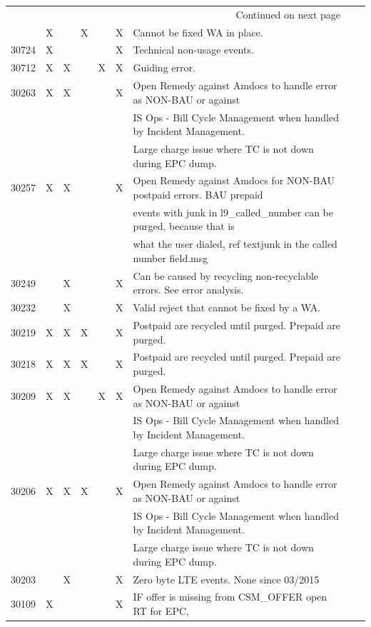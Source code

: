 \documentclass[12pt,twoside]{article}
\begin{document}
\begin{landscape}
\begin{longtable}{l|l|l|l|l|l|l|l|l}
\hline
\endhead
\hline\multicolumn{7}{r}{Continued on next page} \\
\endfoot
\endlastfoot
\hline
30728 & X &  & X &  & X & Cannot be fixed WA in place.\\
30724 & X &  &  &  & X & Technical non-usage events.\\
30712 & X & X &  & X & X & Guiding error.\\
30263 & X & X &  &  & X & Open Remedy against Amdocs to handle error as NON-BAU or against\\
 &  &  &  &  &  & IS Ops - Bill Cycle Management when handled by Incident Management.\\
 &  &  &  &  &  & Large charge issue where TC is not down during EPC dump.\\
30257 & X & X &  &  & X & Open Remedy against Amdocs for NON-BAU postpaid errors.  BAU prepaid\\
 &  &  &  &  &  & events with junk in l9\_called\_number can be purged, because that is\\
 &  &  &  &  &  & what the user dialed, ref  textjunk in the called number field.msg\\
30249 &  & X &  &  & X & Can be caused by recycling non-recyclable errors.  See error analysis.\\
30232 &  & X &  &  & X & Valid reject that cannot be fixed by a WA.\\
30219 & X & X & X &  & X & Postpaid are recycled until purged.  Prepaid are purged.\\
30218 & X & X & X &  & X & Postpaid are recycled until purged.  Prepaid are purged.\\
30209 & X & X &  & X & X & Open Remedy against Amdocs to handle error as NON-BAU or against\\
 &  &  &  &  &  & IS Ops - Bill Cycle Management when handled by Incident Management.\\
 &  &  &  &  &  & Large charge issue where TC is not down during EPC dump.\\
30206 & X & X & X &  & X & Open Remedy against Amdocs to handle error as NON-BAU or against\\
 &  &  &  &  &  & IS Ops - Bill Cycle Management when handled by Incident Management.\\
 &  &  &  &  &  & Large charge issue where TC is not down during EPC dump.\\
30203 &  & X &  &  & X & Zero byte LTE events.  None since 03/2015\\
30109 & X &  &  &  & X & IF offer is missing from CSM\_OFFER open RT for EPC,\\

\end{longtable}
\end{landscape}
\end{document}

